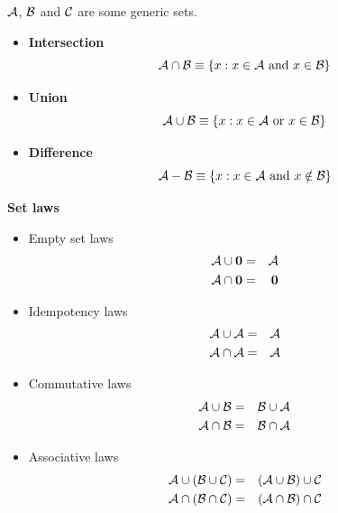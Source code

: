 \documentclass[justified, sixbynine]{tufte-book}
\def\subsubsection#1{{\bf #1}}
\theoremstyle{plain}%
\newtheorem * {corollary}{Corollary}
\theoremstyle{definition}
\theoremstyle{remark}
\newtheorem * {remark}{Remark}
\newtheorem * {note}{Note}
\begin{document}
\begin{fullwidth}
${\cal A}$, ${\cal B}$ and ${\cal C}$ are some generic sets.

\begin{itemize}
\item  {\bf Intersection}
\begin{equation}
{\cal A}\cap {\cal B}\equiv \{x:x\in {\cal A}\text{ and }x\in
{\cal B}\}
\end{equation}

\item  {\bf Union}
\begin{equation}
{\cal A}\cup {\cal B}\equiv \{x:x\in {\cal A}\text{ or }x\in {\cal %
B}\}
\end{equation}

\item  {\bf Difference}
\begin{equation}
{\cal A}-{\cal B}\equiv \{x:x\in {\cal A}\text{ and }x\notin {\cal %
B}\}
\end{equation}
\end{itemize}

\subsubsection{Set laws}

\begin{itemize}
\item  Empty set laws
\begin{eqnarray}
{\cal A}\cup {\bf 0} &=&{\cal A} \\
{\cal A}\cap {\bf 0} &=&{\bf 0}
\end{eqnarray}

\item  Idempotency laws
\begin{eqnarray}
{\cal A}\cup {\cal A} &=&{\cal A} \\
{\cal A}\cap {\cal A} &=&{\cal A}
\end{eqnarray}

\item  Commutative laws
\begin{eqnarray}
{\cal A}\cup {\cal B} &=&{\cal B}\cup {\cal A} \\
{\cal A}\cap {\cal B} &=&{\cal B}\cap {\cal A}
\end{eqnarray}

\item  Associative laws
\begin{eqnarray}
{\cal A}\cup ({\cal B}\cup {\cal C}) &=&({\cal A}\cup {\cal B})\cup {\cal C}
\\
{\cal A}\cap ({\cal B\cap C}) &=&({\cal A\cap B})\cap {\cal C}
\end{eqnarray}


\end{itemize}
\end{fullwidth}
\end{document}

